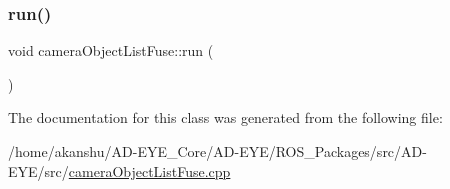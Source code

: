 \mbox{\label{classcameraObjectListFuse_a5fd210063f120d23ce87f461cb8d4ebf}} 
\subsubsection{\texorpdfstring{run()}{run()}}
{\footnotesize\ttfamily void camera\+Object\+List\+Fuse\+::run (\begin{DoxyParamCaption}{ }\end{DoxyParamCaption})\hspace{0.3cm}{\ttfamily [inline]}}



The documentation for this class was generated from the following file\+:\begin{DoxyCompactItemize}
\item 
/home/akanshu/\+A\+D-\/\+E\+Y\+E\+\_\+\+Core/\+A\+D-\/\+E\+Y\+E/\+R\+O\+S\+\_\+\+Packages/src/\+A\+D-\/\+E\+Y\+E/src/\hyperlink{cameraObjectListFuse_8cpp}{camera\+Object\+List\+Fuse.\+cpp}\end{DoxyCompactItemize}
